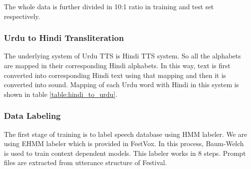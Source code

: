 \begin{itemize}
The whole data is further divided in 10:1 ratio in training and test set respectively.


\subsubsection{Urdu to Hindi Transliteration}

The underlying system of Urdu TTS is Hindi TTS system. So all the alphabets are mapped in their corresponding Hindi alphabets. 
In this way, text is first converted into corresponding Hindi text using that mapping and then it is converted into sound. 
Mapping of each Urdu word with Hindi in this system is shown in table \ref{table:hindi_to_urdu}.

\subsubsection{Data Labeling}

The first stage of training is to label speech database using HMM labeler. We are using EHMM labeler which is provided in FestVox. In this process, Baum-Welch is used to train context dependent models. This labeler works in 8 steps. Prompt files are extracted from utterance structure of Festival.

\end{itemize}
